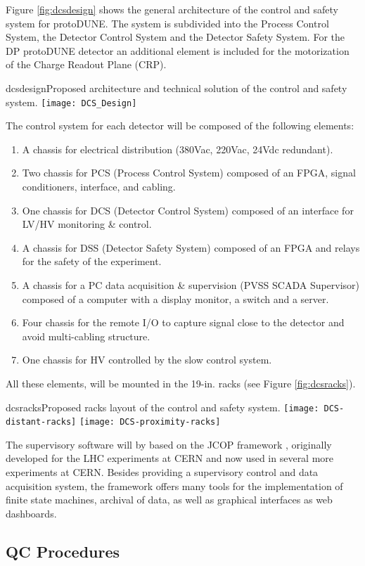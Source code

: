 Figure \ref{fig:dcsdesign} shows the general architecture of the control and safety system for protoDUNE.
The system is subdivided into the Process Control System, the Detector Control System and the Detector Safety System. For the DP protoDUNE detector an additional element is included for the motorization of the Charge Readout Plane (CRP).

\begin{cdrfigure}{dcsdesign}{Proposed architecture and technical solution of the control and safety system.}
\texttt{[image: DCS\_Design]}
\end{cdrfigure}

The control system for each detector will be composed of the following elements:
\begin{enumerate}
\item	A chassis for electrical distribution (380Vac, 220Vac, 24Vdc redundant).
\item	Two chassis for PCS (Process Control System) composed of an FPGA, signal conditioners, interface, and cabling.
\item	One chassis for DCS (Detector Control System) composed of an interface for LV/HV monitoring \& control.
\item	A chassis for DSS (Detector Safety System) composed of an FPGA and relays for the safety of the experiment.
\item	A chassis for a PC data acquisition \& supervision (PVSS SCADA Supervisor) composed of a computer with a display monitor, a switch and a 
server.
\item	Four chassis for the remote I/O to capture signal close to the detector and avoid multi-cabling structure.
\item	One chassis for HV controlled by the slow control system.
\end{enumerate}
All these elements, will be mounted in the 19-in. racks (see Figure \ref{fig:dcsracks}).
\begin{cdrfigure}{dcsracks}{Proposed racks layout of the control and safety system.}
\texttt{[image: DCS-distant-racks]}
\texttt{[image: DCS-proximity-racks]}
\end{cdrfigure}

The supervisory software will by based on the JCOP framework , originally developed for the LHC experiments at CERN and now used in several more experiments at CERN. Besides providing a supervisory control and data acquisition system, the framework offers many tools for the implementation of finite state machines, archival of data, as well as graphical interfaces as web dashboards.

\subsection{QC Procedures}
